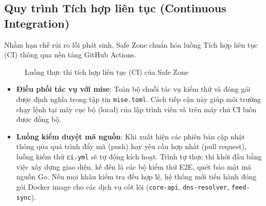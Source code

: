 \subsection{Quy trình Tích hợp liên tục (Continuous Integration)}
Nhằm hạn chế rủi ro lỗi phát sinh, Safe Zone chuẩn hóa luồng Tích hợp liên tục (CI) thông qua nền tảng GitHub Actions.

\begin{figure}[H]
    \centering
    
    \caption{Luồng thực thi tích hợp liên tục (CI) của Safe Zone}
    \label{fig:ci_cd_pipeline}
\end{figure}

\begin{itemize}
    \item \textbf{Điều phối tác vụ với mise}: Toàn bộ chuỗi tác vụ kiểm thử và đóng gói được định nghĩa trong tập tin \texttt{mise.toml}. Cách tiếp cận này giúp môi trường chạy lệnh tại máy cục bộ (local) của lập trình viên và trên máy chủ CI luôn được đồng bộ.
    \item \textbf{Luồng kiểm duyệt mã nguồn}: Khi xuất hiện các phiên bản cập nhật thông qua quá trình đẩy mã (push) hay yêu cầu hợp nhất (pull request), luồng kiểm thử \texttt{ci.yml} sẽ tự động kích hoạt. Trình tự thực thi khởi đầu bằng việc xây dựng giao diện, kế đến là các bộ kiểm thử E2E, quét bảo mật mã nguồn Go. Nếu mọi khâu kiểm tra đều hợp lệ, hệ thống mới tiến hành đóng gói Docker image cho các dịch vụ cốt lõi (\texttt{core-api}, \texttt{dns-resolver}, \texttt{feed-sync}).
\end{itemize}
